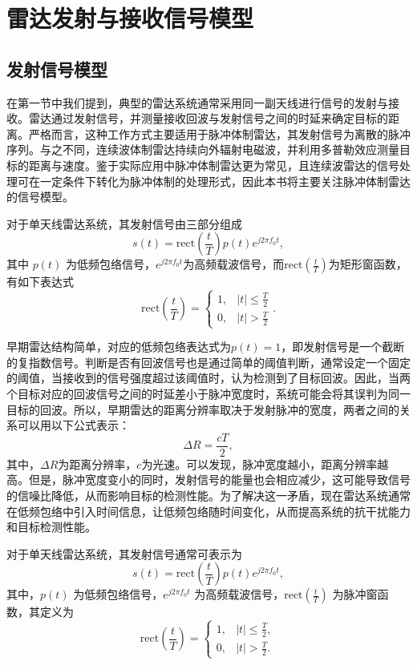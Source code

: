 \chapter{雷达发射与接收信号模型}

\section{发射信号模型}
在第一节中我们提到，典型的雷达系统通常采用同一副天线进行信号的发射与接收。雷达通过发射信号，并测量接收回波与发射信号之间的时延来确定目标的距离。严格而言，这种工作方式主要适用于脉冲体制雷达，其发射信号为离散的脉冲序列。与之不同，连续波体制雷达持续向外辐射电磁波，并利用多普勒效应测量目标的距离与速度。鉴于实际应用中脉冲体制雷达更为常见，且连续波雷达的信号处理可在一定条件下转化为脉冲体制的处理形式，因此本书将主要关注脉冲体制雷达的信号模型。

对于单天线雷达系统，其发射信号由三部分组成
\[
    s(t) = \text{rect}\left(\frac{t}{T}\right) p(t) e^{j 2 \pi f_0 t},
\]
其中 \( p(t) \) 为低频包络信号，\( e^{j 2 \pi f_0 t} \)为高频载波信号，而\( \text{rect}\left(\frac{t}{T}\right) \)为矩形窗函数，有如下表达式
\[
    \text{rect}\left(\frac{t}{T}\right) =
    \begin{cases}
        1, & |t| \leq \frac{T}{2} \\
        0, & |t| > \frac{T}{2}
    \end{cases}.
\]

早期雷达结构简单，对应的低频包络表达式为\( p(t) = 1 \)，即发射信号是一个截断的复指数信号。判断是否有回波信号也是通过简单的阈值判断，通常设定一个固定的阈值，当接收到的信号强度超过该阈值时，认为检测到了目标回波。因此，当两个目标对应的回波信号之间的时延差小于脉冲宽度时，系统可能会将其误判为同一目标的回波。所以，早期雷达的距离分辨率取决于发射脉冲的宽度，两者之间的关系可以用以下公式表示：
\[
    \Delta R = \frac{cT}{2},
\]
其中，\( \Delta R \)为距离分辨率，\( c \)为光速。可以发现，脉冲宽度越小，距离分辨率越高。但是，脉冲宽度变小的同时，发射信号的能量也会相应减少，这可能导致信号的信噪比降低，从而影响目标的检测性能。为了解决这一矛盾，现在雷达系统通常在低频包络中引入时间信息，让低频包络随时间变化，从而提高系统的抗干扰能力和目标检测性能。

对于单天线雷达系统，其发射信号通常可表示为
\begin{equation}
    s(t) = \text{rect}\left(\frac{t}{T}\right) p(t) e^{j 2 \pi f_0 t},
\end{equation}
其中，$p(t)$ 为低频包络信号，$e^{j 2 \pi f_0 t}$ 为高频载波信号，$\text{rect}\left(\frac{t}{T}\right)$ 为脉冲窗函数，其定义为
\begin{equation}
    \text{rect}\left(\frac{t}{T}\right) =
    \begin{cases}
        1, & |t| \leq \frac{T}{2}, \\
        0, & |t| > \frac{T}{2}.
    \end{cases}
\end{equation}

